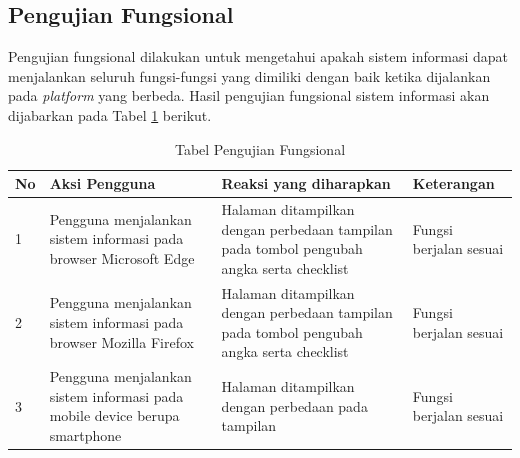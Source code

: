 		
		\subsection{Pengujian Fungsional}
		\label{sub: PFungsional}
		Pengujian fungsional dilakukan untuk mengetahui apakah sistem informasi dapat menjalankan seluruh fungsi-fungsi yang dimiliki dengan baik ketika dijalankan pada \textit{platform} yang berbeda. Hasil pengujian fungsional sistem informasi akan dijabarkan pada Tabel \ref{pengFung} berikut.
		
	\begin{table}[H]
		\centering
		\caption{Tabel Pengujian Fungsional}
		\label{pengFung}
		\begin{tabular}{| m{0.75cm} | m{7cm} | m{5cm} | m{3cm} |}
			\hline
			No & Aksi Pengguna & Reaksi yang diharapkan & Keterangan \\
			\hline
			1 & Pengguna menjalankan sistem informasi pada browser Microsoft Edge & Halaman ditampilkan dengan perbedaan tampilan pada tombol pengubah angka serta checklist & Fungsi berjalan sesuai \\
			\hline
			2 & Pengguna menjalankan sistem informasi pada browser Mozilla Firefox & Halaman ditampilkan dengan perbedaan tampilan pada tombol pengubah angka serta checklist & Fungsi berjalan sesuai \\
			\hline
			3 & Pengguna menjalankan sistem informasi pada mobile device berupa smartphone & Halaman ditampilkan dengan perbedaan pada tampilan & Fungsi berjalan sesuai \\
			\hline
		\end{tabular}
	\end{table}

